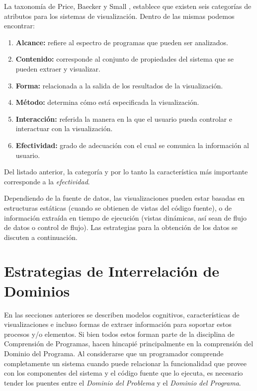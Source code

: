 La taxonomía de Price, Baecker y Small \cite{PriceBaeckerSmall93}, establece que
existen seis categorías de atributos para los sistemas de visualización.
Dentro de las mismas podemos encontrar:
\begin{enumerate}
    \item \textbf{Alcance:} refiere al espectro de programas que pueden ser analizados.
    \item \textbf{Contenido:} corresponde al conjunto de propiedades del sistema que se pueden
    extraer y visualizar.
    \item \textbf{Forma:} relacionada a la salida de los resultados de la visualización.
    \item \textbf{Método:} determina cómo está especificada la visualización.
    \item \textbf{Interacción:} referida la manera en la que el usuario pueda controlar e
    interactuar con la visualización.
    \item \textbf{Efectividad:} grado de adecuación con el cual se comunica la información
    al usuario.
\end{enumerate}
Del listado anterior, la categoría y por lo tanto la característica más importante corresponde
a la \textit{efectividad}.

Dependiendo de la fuente de datos, las visualizaciones pueden estar basadas en
estructuras estáticas (cuando se obtienen de vistas del código fuente), o de
información extraída en tiempo de ejecución (vistas dinámicas, así sean de flujo de datos
o control de flujo). \cite{PetreDeQuincey06}
Las estrategias para la obtención de los datos se discuten a continuación.

\section{Estrategias de Interrelación de Dominios}

En las secciones anteriores se describen modelos cognitivos, características de
visualizaciones e incluso formas de extraer información para soportar estos 
procesos y/o elementos.
Si bien todos estos forman parte de la disciplina de Comprensión de Programas, hacen
hincapié principalmente en la comprensión del Dominio del Programa.
Al considerarse que un programador comprende completamente un sistema cuando puede
relacionar la funcionalidad que provee con los componentes del sistema y el código
fuente que lo ejecuta, es necesario tender los puentes entre el \textit{Dominio del Problema}
y el \textit{Dominio del Programa}.

